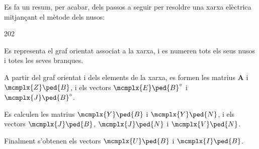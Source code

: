 Es fa un resum, per acabar, dels passos a seguir per resoldre una
xarxa elèctrica mitjançant el mètode dels nusos:
\begin{dingautolist}{202}
   \item Es representa el graf orientat associat a la xarxa, i es numeren tots els seus nusos i totes les seves branques.
   \item A partir del graf orientat i dels elements de la xarxa, es formen les matrius $\boldsymbol{A}$ i $\mcmplx{Z}\ped{B}$, i els vectors $\mcmplx{E}\ped{B}^\circ$ i $\mcmplx{J}\ped{B}^\circ$.
   \item Es calculen les matrius $\mcmplx{Y}\ped{B}$ i $\mcmplx{Y}\ped{N}$, i els vectors $\mcmplx{J}\ped{B}$,  $\mcmplx{J}\ped{N}$ i $\mcmplx{V}\ped{N}$.
   \item Finalment s'obtenen els vectors  $\mcmplx{U}\ped{B}$ i $\mcmplx{I}\ped{B}$.
\end{dingautolist}


